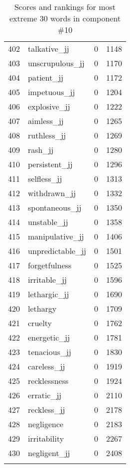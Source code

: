 \begin{longtable}[!htbp]{| rlr@{.}l |}
    402 & talkative\_jj & 0 & 1148 \\
    403 & unscrupulous\_jj & 0 & 1170 \\
    404 & patient\_jj & 0 & 1172 \\
    405 & impetuous\_jj & 0 & 1204 \\
    406 & explosive\_jj & 0 & 1222 \\
    407 & aimless\_jj & 0 & 1265 \\
    408 & ruthless\_jj & 0 & 1269 \\
    409 & rash\_jj & 0 & 1280 \\
    410 & persistent\_jj & 0 & 1296 \\
    411 & selfless\_jj & 0 & 1313 \\
    412 & withdrawn\_jj & 0 & 1332 \\
    413 & spontaneous\_jj & 0 & 1350 \\
    414 & unstable\_jj & 0 & 1358 \\
    415 & manipulative\_jj & 0 & 1406 \\
    416 & unpredictable\_jj & 0 & 1501 \\
    417 & forgetfulness & 0 & 1525 \\
    418 & irritable\_jj & 0 & 1596 \\
    419 & lethargic\_jj & 0 & 1690 \\
    420 & lethargy & 0 & 1709 \\
    421 & cruelty & 0 & 1762 \\
    422 & energetic\_jj & 0 & 1781 \\
    423 & tenacious\_jj & 0 & 1830 \\
    424 & careless\_jj & 0 & 1919 \\
    425 & recklessness & 0 & 1924 \\
    426 & erratic\_jj & 0 & 2110 \\
    427 & reckless\_jj & 0 & 2178 \\
    428 & negligence & 0 & 2183 \\
    429 & irritability & 0 & 2267 \\
    430 & negligent\_jj & 0 & 2408 \\
    \hline
    \caption{Scores and rankings for most extreme 30 words in component \#10} \\
\end{longtable}
